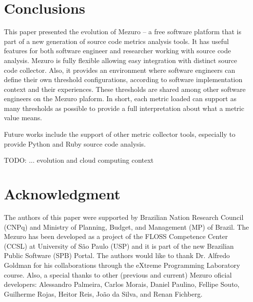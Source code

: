 \section{Conclusions}
\label{sec:conclusions}


This paper presented the evolution of Mezuro -- a free software platform that
is part of a new generation of source code metrics analysis tools.  It has
useful features for both software engineer and researcher working with source
code analysis. Mezuro is fully flexible allowing easy integration with distinct
source code collector. Also, it provides an environment where software
engineers can define their own threshold configurations, according to software
implementation context and their experiences. These thresholds are shared among
other software engineers on the Mezuro plaform.  In short, each metric loaded
can support as many thresholds as possible to provide a full interpretation
about what a metric value means.

Future works include the support of other metric collector tools, especially
to provide Python and Ruby source code analysis.

TODO: ... evolution and cloud computing context

\section*{Acknowledgment}

The authors of this paper were supported by Brazilian Nation Research Council
(CNPq) and Ministry of Planning, Budget, and Management (MP) of Brazil. 
%
The Mezuro has been developed as a project of the FLOSS Competence Center
(CCSL) at University of São Paulo (USP) and it is part of the new Brazilian
Public Software (SPB) Portal.
%
The authors would like to thank Dr. Alfredo Goldman for his collaborations
through the eXtreme Programming Laboratory course.
%
Also, a special thanks to other (previous and current) Mezuro oficial developers:
Alessandro Palmeira,
Carlos Morais,
Daniel Paulino,
Fellipe Souto,
Guilherme Rojas,
Heitor Reis,
João da Silva, and
Renan Fichberg.
